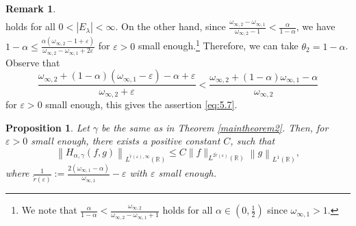 \documentclass[11pt, twoside, leqno]{article}
\newtheorem{proposition}[theorem]{Proposition}
\theoremstyle{definition}
\newtheorem{remark}[theorem]{Remark}
\numberwithin{equation}{section}
\begin{document}
\begin{remark}
\begin{align*}
\end{align*}
holds for all $0<|E_\lambda|<\infty$. On the other hand, since $\frac{\omega_{\infty,2}-\omega_{\infty,1}}{\omega_{\infty,2}-1}<\frac{\alpha}{1-\alpha}$, we have $1-\alpha\leq \frac{\alpha(\omega_{\infty,2}-1+\varepsilon)}{\omega_{\infty,2}-\omega_{\infty,1}+2\varepsilon}$ for $\varepsilon>0$ small enough.\footnote{We note that $\frac{\alpha}{1-\alpha}<\frac{\omega_{\infty,2}}{\omega_{\infty,2}-\omega_{\infty,1}+1}$ holds for all $\alpha\in(0, \frac{1}{2})$ since $\omega_{\infty,1}>1$.} Therefore, we can take $\theta_2=1-\alpha$. Observe that $$\frac{\omega_{\infty,2}+ (1-\alpha)(\omega_{\infty,1}-\varepsilon)-\alpha+\varepsilon}{\omega_{\infty,2}+\varepsilon}<\frac{\omega_{\infty,2}+ (1-\alpha)\omega_{\infty,1}-\alpha} {\omega_{\infty,2}}$$ for $\varepsilon>0$ small enough, this gives the assertion \eqref{eq:5.7}.
\end{remark}

\begin{proposition}\label{proposition 5.2}
Let $\gamma $ be the same as in Theorem \ref{maintheorem2}. Then, for $\varepsilon>0$ small enough, there exists a positive constant $C$, such that
$$\left\|H_{\alpha,\gamma}(f,g)\right\|_{L^{\tilde{r}(\varepsilon),\infty}(\mathbb{R})}\leq C \|f\|_{L^{2\tilde{r}(\varepsilon)}(\mathbb{R})}\left\|g\right\|_{L^{1}(\mathbb{R})},$$
where $\frac{1}{\tilde{r}( \varepsilon ) }:=\frac{2(\omega_{\infty,1}-\alpha)}{\omega_{\infty,1}}-\varepsilon $ with $\varepsilon$ small enough.
\end{proposition}
\end{document}
